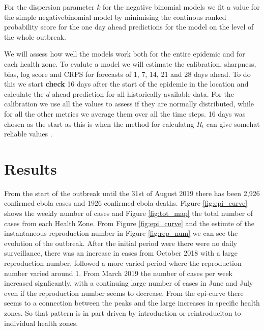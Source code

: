 \documentclass[12pt]{article}
\begin{document}
For the dispersion parameter $k$ for the negative binomial models we fit a value for the simple negativebinomial model by minimising the continous ranked probability score for the one day ahead predictions for the model on the level of the whole outbreak. 

We will assess how well the models work both for the entire epidemic and for each health zone. To evalute a model we will estimate the calibration, sharpness, bias, log score and CRPS for forecasts of 1, 7, 14, 21 and 28 days ahead. To do this we start { \bf check } 16 days after the start of the epidemic in the location and calculate the $d$ ahead prediction for all historically available data. For the calibration we use all the values to assess if they are normally distributed, while for all the other metrics we average them over all the time steps. 16 days was chosen as the start as this is when the method for calculatng $R_t$ can give somehat reliable values \cite{coriNewFrameworkSoftware2013}. 



\section{Results}
From the start of the outbreak until the 31st of August 2019 there has been 2,926 confirmed ebola cases and 1926 confirmed ebola deaths. Figure \ref{fig:epi_curve} shows the weekly number of cases and Figure \ref{fig:tot_map} the total number of cases from each Health Zone. From Figure \ref{fig:epi_curve} and the estimte of the instantaneous reproduction number in Figure \ref{fig:rep_num} we can see the evolution of the outbreak. After the initial period were there were no daily surveillance, there was an increase in cases from October 2018 with a large reproduction number, followed a more varied period where the reproduction number varied around 1. From March 2019 the number of cases per week increased signficantly, with a continuing large number of cases in June and July even if the reproduction number seems to decrease. From the epi-curve there seems to a connection between the peaks and the large increases in specific health zones. So that pattern is in part driven by introduction or reintroduciton to individual health zones. 
\end{document}
